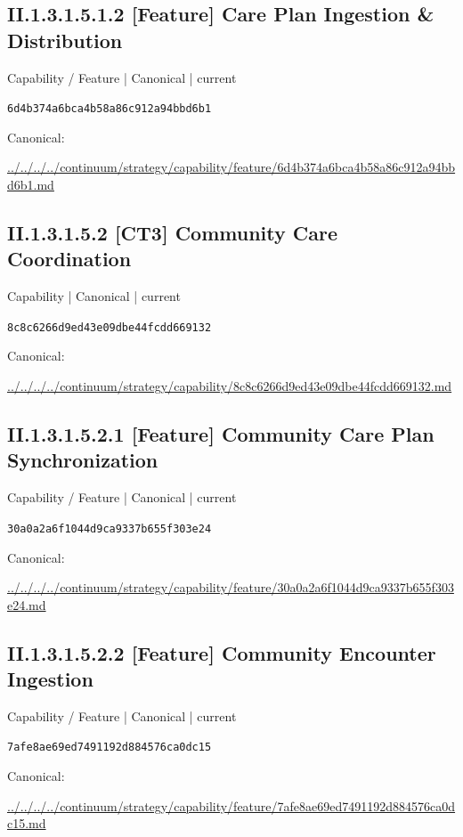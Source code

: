 \documentclass[10pt,a4paper]{article}
\begin{document}
\subsection*{II.1.3.1.5.1.2 [Feature] Care Plan Ingestion \& Distribution}
\label{element-6d4b374a6bca4b58a86c912a94bbd6b1}
{\small Capability / Feature | Canonical | current}\par
\texttt{6d4b374a6bca4b58a86c912a94bbd6b1}\par
Canonical: \par
{\footnotesize\url{../../../../continuum/strategy/capability/feature/6d4b374a6bca4b58a86c912a94bbd6b1.md}}\par
\subsection*{II.1.3.1.5.2 [CT3] Community Care Coordination}
\label{element-8c8c6266d9ed43e09dbe44fcdd669132}
{\small Capability | Canonical | current}\par
\texttt{8c8c6266d9ed43e09dbe44fcdd669132}\par
Canonical: \par
{\footnotesize\url{../../../../continuum/strategy/capability/8c8c6266d9ed43e09dbe44fcdd669132.md}}\par
\subsection*{II.1.3.1.5.2.1 [Feature] Community Care Plan Synchronization}
\label{element-30a0a2a6f1044d9ca9337b655f303e24}
{\small Capability / Feature | Canonical | current}\par
\texttt{30a0a2a6f1044d9ca9337b655f303e24}\par
Canonical: \par
{\footnotesize\url{../../../../continuum/strategy/capability/feature/30a0a2a6f1044d9ca9337b655f303e24.md}}\par
\subsection*{II.1.3.1.5.2.2 [Feature] Community Encounter Ingestion}
\label{element-7afe8ae69ed7491192d884576ca0dc15}
{\small Capability / Feature | Canonical | current}\par
\texttt{7afe8ae69ed7491192d884576ca0dc15}\par
Canonical: \par
{\footnotesize\url{../../../../continuum/strategy/capability/feature/7afe8ae69ed7491192d884576ca0dc15.md}}\par
\end{document}

